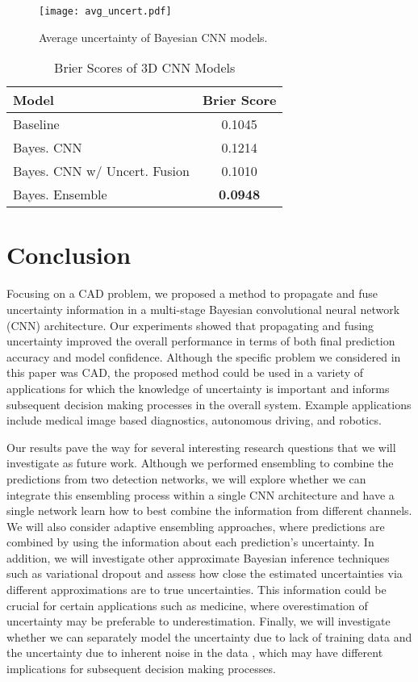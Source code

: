 \documentclass{article}
\begin{document}
\begin{figure}[h!]
	\centering
	\texttt{[image: avg\_uncert.pdf]}
	\caption{Average uncertainty of Bayesian CNN models. }\label{fig:avg_uncert}
	
\end{figure}

\begin{table}[h]
	\small
	\caption{Brier Scores of 3D CNN Models}
	\label{table:comp}
	\centering
	\begin{tabular}{lc}
		\toprule
		Model     & Brier Score \\
		\midrule
		Baseline	&   0.1045   \\
		Bayes. CNN		&   0.1214   \\
		Bayes. CNN w/ Uncert. Fusion   	& 0.1010     \\
		Bayes. Ensemble     			  & \textbf{0.0948} \\
		\bottomrule
	\end{tabular}
\end{table}

\section{Conclusion}\label{sec:res}
Focusing on a CAD problem, we proposed a method to propagate and fuse uncertainty information in a multi-stage Bayesian convolutional neural network (CNN) architecture. Our experiments showed that propagating and fusing uncertainty improved the overall performance in terms of both final prediction accuracy and model confidence. Although the specific problem we considered in this paper was CAD, the proposed method could be used in a variety of applications for which the knowledge of uncertainty is important and informs subsequent decision making processes in the overall system. Example applications include medical image based diagnostics, autonomous driving, and robotics. 

Our results pave the way for several interesting research questions that we will investigate as future work. Although we performed ensembling to combine the predictions from two detection networks, we will explore whether we can integrate this ensembling process within a single CNN architecture and have a single network learn how to best combine the information from different channels. %
We will also consider adaptive ensembling approaches, where predictions are combined by using the information about each prediction's uncertainty. In addition, we will investigate other approximate Bayesian inference techniques such as variational dropout \cite{kingma_nips15} and assess how close the estimated uncertainties via different approximations are to true uncertainties. This information could be crucial for certain applications such as medicine, where overestimation of uncertainty may be preferable to underestimation. Finally, we will investigate whether we can separately model the uncertainty due to lack of training data and the uncertainty due to inherent noise in the data \cite{gal_arxiv17}, which may have different implications for subsequent decision making processes.

    



\end{document}
